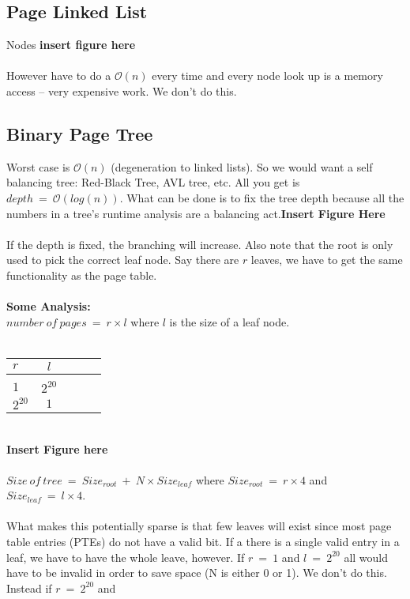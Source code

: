 \documentclass[../base_file/cs1550_notes.tex]{subfiles}
\begin{document}
\subsection{Page Linked List}
Nodes \textbf{insert figure here}\\\\
However have to do a $\mathcal{O}(n)$ every time and every node look up is a memory access -- very expensive work.
We don't do this.
\subsection{Binary Page Tree}
Worst case is $\mathcal{O}(n)$ (degeneration to linked lists).  So we would want a self balancing tree: Red-Black
Tree, AVL tree, etc.  All you get is $depth\ =\ \mathcal{O}(log(n))$.  What can be done is to fix the tree depth
because all the numbers in a tree's runtime analysis are a balancing act.\textbf{Insert Figure Here}\\\\
If the depth is fixed, the branching will increase.  Also note that the root is only used to pick the correct leaf
node.  Say there are $r$ leaves, we have to get the same functionality as the page table.\\\\
\textbf{Some Analysis:}\\
$number\ of\ pages\ =\ r\times l$ where $l$ is the size of a leaf node.\\\\
\begin{tabular}{l*{3}{c}r}
$r$ & $l$\\
\hline\\
$1$ & $2^{20}$\\
$2^{20}$ & $1$\\
\end{tabular}\\
\textbf{Insert Figure here}\\\\
$Size\ of\ tree\ =\ Size_{root}\ +\ N\times Size_{leaf}$ where $Size_{root}\ =\ r\times 4$ and $Size_{leaf}\ =\ l\times 4$.\\\\
What makes this potentially sparse is that few leaves will exist since most page table entries (PTEs) do not have a valid
bit.  If a there is a single valid entry in a leaf, we have to have the whole leave, however.  If $r\ =\ 1$ and $l\ =\ 2^{20}$
all would have to be invalid in order to save space (N is either 0 or 1).  We don't do this.  Instead if $r\ =\ 2^{20}$ and
\end{document}
